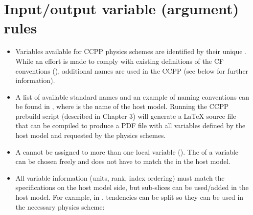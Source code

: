 \documentclass[letterpaper,10pt,english]{sphinxmanual}
\begin{document}
\section{Input/output variable (argument) rules}
\label{\detokenize{CompliantPhysicsParams:input-output-variable-argument-rules}}\begin{itemize}
\item {} 
Variables available for CCPP physics schemes are identified by their unique
. While an effort is made to comply with existing 
definitions of the CF conventions (), additional names
are used in the CCPP (see below for further information).

\item {} 
A list of available standard names and an example of naming conventions can be found in
, where  is the
name of the host model.  Running the CCPP prebuild script (described in Chapter 3)
will generate a LaTeX source file that can be compiled to produce
a PDF file with all variables defined by the host model and requested by the physics schemes.

\item {} 
A  cannot be assigned to more than one local variable ().
The  of a variable can be chosen freely and does not have to match the
 in the host model.

\item {} 
All variable information (units, rank, index ordering) must match the specifications on
the host model side, but sub-slices can be used/added in the host model. For example, in
, tendencies can be split so they can be used in the necessary physics scheme:

\end{itemize}
\end{document}
